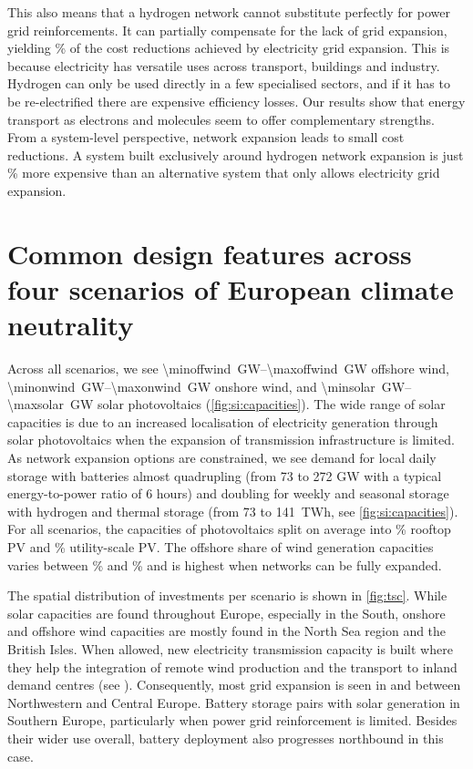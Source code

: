 This also means that a hydrogen network cannot substitute perfectly for power
grid reinforcements. It can partially compensate for the lack of grid expansion,
yielding \benefithyofac\% of the cost reductions achieved by electricity grid
expansion. This is because electricity has versatile uses across transport,
buildings and industry. Hydrogen can only be used directly in a few specialised
sectors, and if it has to be re-electrified there are expensive efficiency
losses. Our results show that energy transport as electrons and molecules seem
to offer complementary strengths. From a system-level perspective, network
expansion leads to small cost reductions. A system built exclusively around
hydrogen network expansion is just \acvshycost\% more expensive than an
alternative system that only allows electricity grid expansion.

\section*{Common design features across four scenarios of European climate neutrality}
\label{sec:es}

Across all scenarios, we see \SIrange{\minoffwind}{\maxoffwind}{\giga\watt}
offshore wind, \SIrange{\minonwind}{\maxonwind}{\giga\watt} onshore wind, and
\SIrange{\minsolar}{\maxsolar}{\giga\watt} solar photovoltaics
(\cref{fig:si:capacities}). The wide range of solar capacities is due to an
increased localisation of electricity generation through solar photovoltaics
when the expansion of transmission infrastructure is limited. As network
expansion options are constrained, we see demand for local daily storage with
batteries almost quadrupling (from 73 to 272 GW with a typical energy-to-power
ratio of 6 hours) and doubling for weekly and seasonal storage with hydrogen and
thermal storage (from 73 to 141~TWh, see \cref{fig:si:capacities}). For all
scenarios, the capacities of photovoltaics split on average into
\meanrooftopshare\% rooftop PV and \meanutilityshare\% utility-scale PV. The
offshore share of wind generation capacities varies between \minoffshoreshare\%
and \maxoffshoreshare\% and is highest when networks can be fully expanded.

The spatial distribution of investments per scenario is shown in \cref{fig:tsc}.
While solar capacities are found throughout Europe, especially in the South,
onshore and offshore wind capacities are mostly found in the North Sea region
and the British Isles. When allowed, new electricity transmission capacity is
built where they help the integration of remote wind production and the
transport to inland demand centres (see ). Consequently, most
grid expansion is seen in and between Northwestern and Central Europe. Battery
storage pairs with solar generation in Southern Europe, particularly when power
grid reinforcement is limited. Besides their wider use overall, battery
deployment also progresses northbound in this case.

